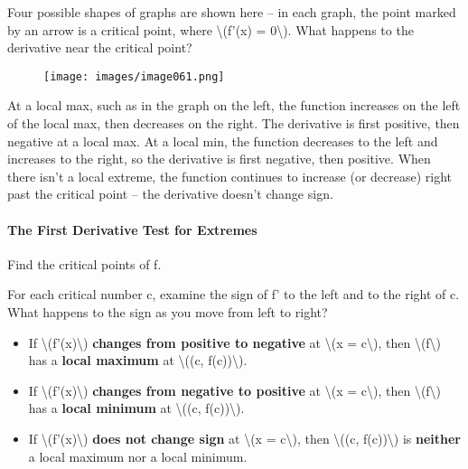 Four possible shapes of graphs are shown here -- in each graph, the
point marked by an arrow is a critical point, where
\textbackslash{}(f'(x) = 0\textbackslash{}). What happens to the
derivative near the critical point?

\begin{figure}
\centering
\texttt{[image: images/image061.png]}
\caption{}
\end{figure}

At a local max, such as in the graph on the left, the function increases
on the left of the local max, then decreases on the right. The
derivative is first positive, then negative at a local max. At a local
min, the function decreases to the left and increases to the right, so
the derivative is first negative, then positive. When there isn't a
local extreme, the function continues to increase (or decrease) right
past the critical point -- the derivative doesn't change sign.

\hypertarget{the-first-derivative-test-for-extremes}{%
\paragraph{The First Derivative Test for
Extremes}\label{the-first-derivative-test-for-extremes}}

Find the critical points of f.

For each critical number c, examine the sign of f' to the left and to
the right of c. What happens to the sign as you move from left to right?

\begin{itemize}
\tightlist
\item
  If \textbackslash{}(f'(x)\textbackslash{}) \textbf{changes from
  positive to negative} at \textbackslash{}(x = c\textbackslash{}), then
  \textbackslash{}(f\textbackslash{}) has a \textbf{local maximum} at
  \textbackslash{}((c, f(c))\textbackslash{}).
\item
  If \textbackslash{}(f'(x)\textbackslash{}) \textbf{changes from
  negative to positive} at \textbackslash{}(x = c\textbackslash{}), then
  \textbackslash{}(f\textbackslash{}) has a \textbf{local minimum} at
  \textbackslash{}((c, f(c))\textbackslash{}).
\item
  If \textbackslash{}(f'(x)\textbackslash{}) \textbf{does not change
  sign} at \textbackslash{}(x = c\textbackslash{}), then
  \textbackslash{}((c, f(c))\textbackslash{}) is \textbf{neither} a
  local maximum nor a local minimum.
\end{itemize}

